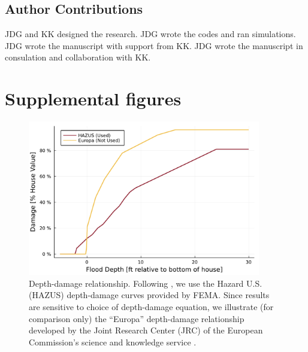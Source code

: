 \documentclass[12pt]{article}
\begin{document}
\subsection*{Author Contributions}

JDG and KK designed the research.
JDG wrote the codes and ran simulations.
JDG wrote the manuscript with support from KK.
JDG wrote the manuscript in consulation and collaboration with KK.

\printbibliography

\appendix
\newcommand{\hbAppendixPrefix}{S}
\renewcommand{\thefigure}{\hbAppendixPrefix\arabic{figure}}
\setcounter{figure}{0}
\renewcommand{\thetable}{\hbAppendixPrefix\arabic{table}}
\setcounter{table}{0}
\renewcommand{\theequation}{\hbAppendixPrefix\arabic{equation}}
\setcounter{equation}{0}

\newpage
\section{Supplemental figures}
\begin{figure}
    \centering
    \includegraphics[width=4in]{cost-depth-damage}
    \caption{
        Depth-damage relationship.
        Following \citet{zarekarizi_suboptimal:2020}, we use the Hazard U.S. (HAZUS) depth-damage curves provided by FEMA.
        Since results are sensitive to choice of depth-damage equation, we illustrate (for comparison only) the ``Europa'' depth-damage relationship developed by the Joint Research Center (JRC) of the European Commission's science and knowledge service \citep{huizinga_depthdamage:2016}.
    }\label{fig:cost-depth-damage}
\end{figure}
\end{document}
